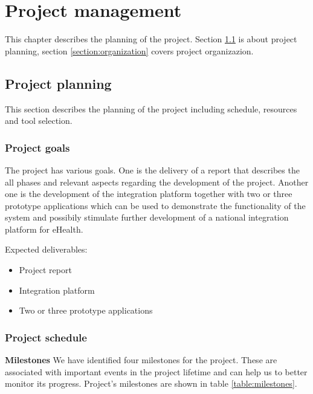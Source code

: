 \chapter{Project management}

\label{ch:management}

This chapter describes the planning of the project. Section \ref{section:planning} is about project planning,
section \ref{section:organization} covers project organizazion.

\section{Project planning}
\label{section:planning}
This section describes the planning of the project including schedule, resources and tool selection.

\subsection{Project goals}
The project has various goals. One is the delivery of a report that describes the all phases and relevant aspects regarding the development of the project. Another one is the development of the integration platform together with two or three prototype applications which can be used to demonstrate the functionality of the system and possibily stimulate further development of a national integration platform for eHealth.

Expected deliverables:

\begin{itemize}
\item Project report
\item Integration platform
\item Two or three prototype applications
\end{itemize}



\subsection{Project schedule}

\textbf{Milestones} \newline
We have identified four milestones for the project. These are associated with important events in the project lifetime and can help us to better monitor its progress. Project's milestones are shown in table \ref{table:milestones}.

